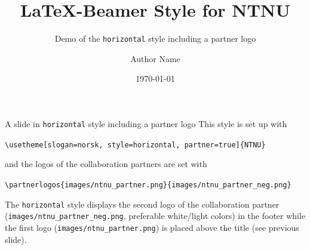 \documentclass[aspectratio=169]{beamer}
\title{\LaTeX{}-Beamer Style for NTNU}
\subtitle{Demo of the  \texttt{horizontal} style including a partner logo}
\author{Author Name}
\date{\today}
\begin{document}
	\maketitle
	\begin{frame}[fragile]{A slide in \texttt{horizontal} style including a partner logo}
		This style is set up with

		\lstinline!\usetheme[slogan=norsk, style=horizontal, partner=true]{NTNU}!

		and the logos of the collaboration partners are set with

		\lstinline!\partnerlogos{images/ntnu_partner.png}{images/ntnu_partner_neg.png}!

		The \texttt{horizontal} style displays the second logo of the
		collaboration partner (\lstinline!images/ntnu_partner_neg.png!,
		preferable white/light colors) in the footer while the first
		logo (\lstinline!images/ntnu_partner.png!) is placed above the title
		(see previous slide).
	\end{frame}
\end{document}
